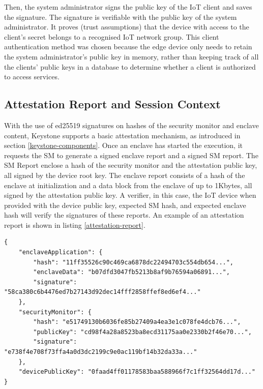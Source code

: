 Then, the system administrator signs the public key of the IoT client and saves the signature. The signature is verifiable with the public key of the system administrator. It proves (trust assumptions) that the device with access to the client's secret belongs to a recognised IoT network group. This client authentication method was chosen because the edge device only needs to retain the system administrator's public key in memory, rather than keeping track of all the clients' public keys in a database to determine whether a client is authorized to access services.

\subsection{Attestation Report and Session Context}
With the use of ed25519 signatures on hashes of the security monitor and enclave content, Keystone supports a basic attestation mechanism, as introduced in section \ref{keystone-components}. Once an enclave has started the execution, it requests the SM to generate a signed enclave report and a signed SM report. The SM Report enclose a hash of the security monitor and the attestation public key, all signed by the device root key. The enclave report consists of a hash of the enclave at initialization and a data block from the enclave of up to 1Kbytes, 
all signed by the attestation public key. A verifier, in this case, the IoT device when provided with the device public key, expected SM hash, and expected enclave hash will verify the signatures of these reports. An example of an attestation report is shown in listing \ref{attestation-report}. \\

\begin{lstlisting}[caption={Example of a attestation report  generated by the enclave},captionpos=b,style=json, label={attestation-report},frame=single]
{
    "enclaveApplication": {
        "hash": "11ff35526c90c469ca6878dc22494703c554db654...",
        "enclaveData": "b07dfd3047fb5213b8af9b76594a06891...",
        "signature": "58ca380c6b4476ed7b27143d92dec14fff2858ffef8ed6ef4..."
    },
    "securityMonitor": {
        "hash": "e51749130b6036fe85b27409a4ea3e1c078fe4dcb76...",
        "publicKey": "cd98f4a28a8523ba8ecd31175aa0e2330b2f46e70...",
        "signature": "e738f4e708f73ffa4a0d3dc2199c9e0ac119bf14b32da33a..."
    },
    "devicePublicKey": "0faad4ff01178583baa588966f7c1ff32564dd17d..."
}
\end{lstlisting}

